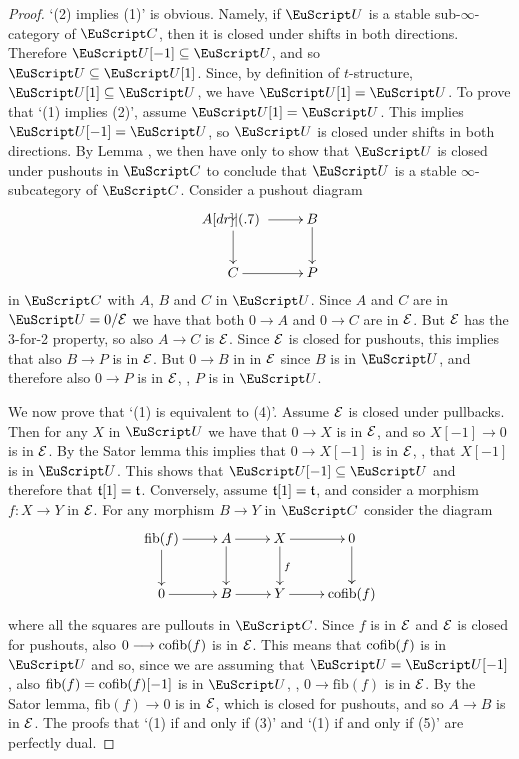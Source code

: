 \begin{proof}
`(2) implies (1)' is obvious. Namely, if  $\cate{U}$ is a stable sub-$\infty$-category of $\C$, then it is closed under shifts in both directions. Therefore $\cate{U}[-1]\subseteq \cate{U}$, and so $\cate{U}\subseteq \cate{U}[1]$. Since, by definition of $t$-structure, $\cate{U}[1]\subseteq \cate{U}$, we have $\cate{U}[1]= \cate{U}$. To prove that `(1) implies (2)', assume $\cate{U}[1]=\cate{U}$. This implies $\cate{U}[-1]= \cate{U}$, so $\cate{U}$ is closed under shifts in both directions. By Lemma ,  we then have only to show that $\cate{U}$ is closed under pushouts in $\C$ to conclude that $\cate{U}$ is a stable $\infty$-subcategory of $\C$. 
Consider a pushout diagram
\[
\xymatrix{
 A \ar[r]\ar[d] \po & B\ar[d] \\
 C \ar[r] & P
}
\]
in $\C$ with $A$, $B$ and $C$ in $\cate{U}$. Since $A$ and $C$ are in $\cate{U} = 0/\E$ we have that both $0\to A$ and $0\to C$ are in $\mathcal{E}$. But $\mathcal{E}$ has the 3-for-2 property, so also $A\to C$ is $\mathcal{E}$. Since $\mathcal{E}$ is closed for pushouts, this implies that also $B\to P$ is in $\mathcal{E}$. But $0\to B$ in in $\mathcal{E}$ since $B$ is in $\cate{U}$, and therefore also $0\to P$ is in $\mathcal{E}$, \ie, $P$ is in $\cate{U}$. 

We now prove that `(1) is equivalent to (4)'. Assume $\mathcal{E}$ is closed under pullbacks. Then for any $X$ in $\cate{U}$ we have that $0\to X$ is in $\mathcal{E}$, and so $X[-1]\to 0$ is in $\mathcal{E}$. By the Sator lemma this implies that $0\to X[-1]$ is in $\mathcal{E}$, \ie, that $X[-1]$ is in $\cate{U}$. This shows that $\cate{U}[-1]\subseteq \cate{U}$ and therefore that $\mathfrak{t}[1]= \mathfrak{t}$. Conversely, assume $\mathfrak{t}[1]=\mathfrak{t}$,
and consider a morphism $f\colon X\to Y$ in $\mathcal{E}$. For any morphism $B\to Y$ in $\C$
consider the diagram
\[
\xymatrix{
\mathrm{fib}(f)\ar[r]\ar[d] & A\ar[r]\ar[d] & X\ar[r]\ar[d]^{f} & 0\ar[d]\\
0 \ar[r] & B\ar[r]  & Y\ar[r]  & \cofib(f)
}
\]
where all the squares are pullouts in $\C$. Since $f$ is in $\mathcal{E}$ and $\mathcal{E}$ is closed for pushouts, also $0\longrightarrow \operatorname{cofib}(f)$ is in $\mathcal{E}$. This means that $\operatorname{cofib}(f)$ is in $\cate{U}$ and so, since we are assuming that $\cate{U}=\cate{U}[-1]$, also $\mathrm{fib}(f)=\operatorname{cofib}(f)[-1]$ is in $\cate{U}$, \ie,  $0\to \mathrm{fib}(f)$ is in $\mathcal{E}$. By the Sator lemma, $\mathrm{fib}(f)\to 0$ is in $\mathcal{E}$, which is closed for pushouts, and so $A\to B$ is in $\mathcal{E}$. The proofs that `(1) if and only if (3)' and `(1) if and only if (5)' are perfectly dual.
\end{proof}



